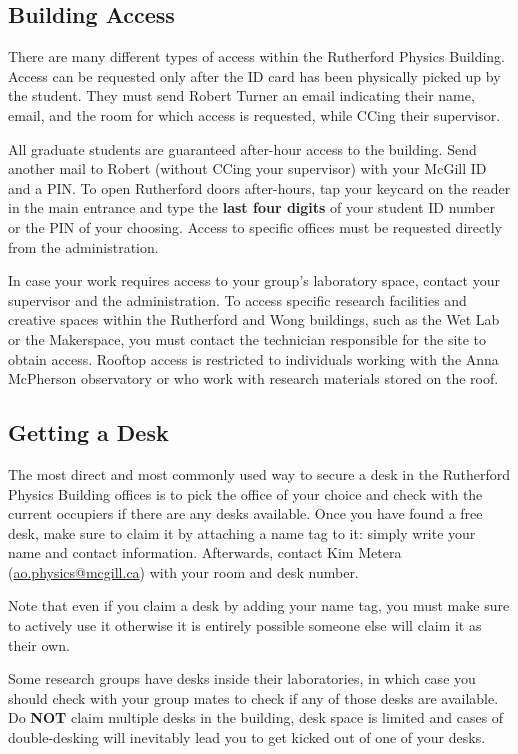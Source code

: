 \subsection*{Building Access}
There are many different types of access within the Rutherford Physics Building. Access can be requested only after the ID card has been physically picked up by the student. They must send Robert Turner an email indicating their name, email, and the room for which access is requested, while CCing their supervisor. 

All graduate students are guaranteed after-hour access to the building. Send another mail to Robert (without CCing your supervisor) with your McGill ID and a PIN. To open Rutherford doors after-hours, tap your keycard on the reader in the main entrance and type the \textbf{\color{ocre} last four digits} of your student ID number or the PIN of your choosing. Access to specific offices must be requested directly from the administration. 

In case your work requires access to your group's laboratory space, contact your supervisor and the administration. To access specific research facilities and creative spaces within the Rutherford and Wong buildings, such as the Wet Lab or the Makerspace, you must contact the technician responsible for the site to obtain access. Rooftop access is restricted to individuals working with the Anna McPherson observatory or who work with research materials stored on the roof.


\subsection*{Getting a Desk} 
The most direct and most commonly used way to secure a desk in the Rutherford Physics Building offices is to pick the office of your choice and check with the current occupiers if there are any desks available. Once you have found a free desk, make sure to claim it by attaching a name tag to it: simply write your name and contact information. Afterwards, contact Kim Metera (\href{mailto:ao.physics@mcgill.ca}{ao.physics@mcgill.ca}) with your room and desk number.

\begin{plainexercise}
 Note that even if you claim a desk by adding your name tag, you must make sure to actively use it otherwise it is entirely possible someone else will claim it as their own.    
\end{plainexercise}
\vspace{-5pt}
Some research groups have desks inside their laboratories, in which case you should check with your group mates to check if any of those desks are available. Do \textbf{NOT} claim multiple desks in the building, desk space is limited and cases of double-desking will inevitably lead you to get kicked out of one of your desks.

